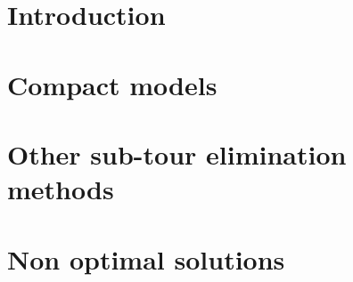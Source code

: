 
\thispagestyle{empty}

%

\tableofcontents %

\clearpage{\pagestyle{plain}\cleardoublepage} %


\chapter{Introduction} %
\label{chapter:primo_capitolo} %

\chapter{Compact models} 
\label{chapter:compact-models} 
 

\clearpage{\pagestyle{plain}\cleardoublepage}
\chapter{Other sub-tour elimination methods} 
\label{chapter:other-sec} 
 

\clearpage{\pagestyle{plain}\cleardoublepage}
\chapter{Non optimal solutions} 
\label{chapter:codice} 
 

\clearpage{\pagestyle{plain}\cleardoublepage}


